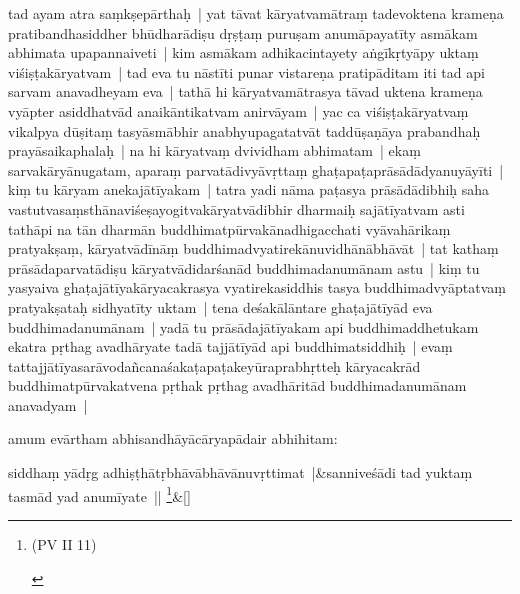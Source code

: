 \documentclass[article,a4paper]{memoir}
\begin{document}
	  \pstart tad ayam atra saṃkṣepā\-rthaḥ | yat tā\-vat kā\-ryatvamā\-traṃ tadevoktena krameṇa pratibandhasiddher bhū\-dharā\-diṣu dṛṣṭaṃ puruṣam anumā\-payatī\-ty asmā\-kam abhimata upapannaiveti | kim asmā\-kam adhikacintayety aṅgī\-kṛtyā\-py uktaṃ viśiṣṭakā\-ryatvam | tad eva tu nā\-stī\-ti punar vistareṇa pratipā\-ditam iti tad api sarvam anavadheyam eva | tathā\- hi kā\-ryatvamā\-trasya tā\-vad uktena krameṇa vyā\-pter asiddhatvā\-d anaikā\-ntikatvam anirvā\-yam | yac ca viśiṣṭakā\-ryatvaṃ vikalpya dū\-ṣitaṃ tasyā\-smā\-bhir anabhyupagatatvā\-t taddū\-ṣaṇā\-ya prabandhaḥ prayā\-saikaphalaḥ | na hi kā\-ryatvaṃ dvividham abhimatam | ekaṃ sarvakā\-ryā\-nugatam, aparaṃ parvatā\-divyā\-vṛttaṃ ghaṭapaṭaprā\-sā\-dā\-dyanuyā\-yī\-ti | kiṃ tu kā\-ryam anekajā\-tī\-yakam | tatra yadi nā\-ma paṭasya prā\-sā\-dā\-dibhiḥ saha vastutvasaṃsthā\-naviśeṣayogitvakā\-ryatvā\-dibhir dharmaiḥ sajā\-tī\-yatvam asti tathā\-pi na tā\-n dharmā\-n buddhimatpū\-rvakā\-nadhigacchati vyā\-vahā\-rikaṃ pratyakṣaṃ, kā\-ryatvā\-dī\-nā\-ṃ buddhimadvyatirekā\-nuvidhā\-nā\-bhā\-vā\-t | tat kathaṃ prā\-sā\-daparvatā\-diṣu kā\-ryatvā\-didarśanā\-d buddhimadanumā\-nam astu | kiṃ tu yasyaiva ghaṭajā\-tī\-yakā\-ryacakrasya vyatirekasiddhis tasya buddhimadvyā\-ptatvaṃ pratyakṣataḥ sidhyatī\-ty uktam | tena deśakā\-lā\-ntare ghaṭajā\-tī\-yā\-d eva buddhimadanumā\-nam | yadā\- tu prā\-sā\-dajā\-tī\-yakam api buddhimaddhetukam ekatra pṛthag avadhā\-ryate tadā\- tajjā\-tī\-yā\-d api buddhimatsiddhiḥ | evaṃ tattajjā\-tī\-yasarā\-vodañcanaśakaṭapaṭakeyū\-raprabhṛtteḥ kā\-ryacakrā\-d buddhimatpū\-rvakatvena pṛthak pṛthag avadhā\-ritā\-d buddhimadanumā\-nam anavadyam |
	\pend
      

	  \pstart amum evā\-rtham abhisandhā\-yā\-cā\-ryapā\-dair abhihitam:
	\pend
      
	    
	    \stanza[\smallbreak]
siddhaṃ yā\-dṛg adhiṣṭhā\-tṛbhā\-vā\-bhā\-vā\-nuvṛttimat |&sanniveśā\-di tad yuktaṃ tasmā\-d yad anumī\-yate || \footnote{\begin{english}(PV II 11)\end{english}}\&[\smallbreak]


	
\end{document}
